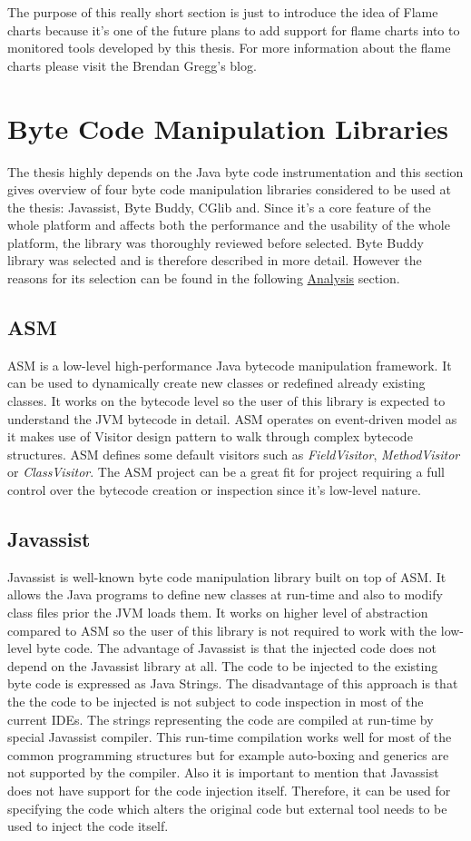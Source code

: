 The purpose of this really short section is just to introduce the idea of Flame charts because it's one of the future plans to add support for flame charts into to monitored tools developed by this thesis. For more information about the flame charts please visit the Brendan Gregg's blog.
\section{Byte Code Manipulation Libraries}
The thesis highly depends on the Java byte code instrumentation and this section gives overview of four byte code manipulation libraries considered to be used at the thesis:  Javassist, Byte Buddy, CGlib and. Since it's a core feature of the whole platform and affects both the performance and the usability of the whole platform, the library was thoroughly reviewed before selected. Byte Buddy library was selected and is therefore described in more detail. However the reasons for its selection can be found in the following \hyperref[analysis]{Analysis} section.

\subsection{ASM}
ASM is a low-level high-performance Java bytecode manipulation framework. It can be used to dynamically create new classes or redefined already existing classes. It works on the bytecode level so the user of this library is expected to understand the JVM bytecode in detail. ASM operates on event-driven model as it makes use of Visitor design pattern to walk through complex bytecode structures. ASM defines some default visitors such as \textit{FieldVisitor}, \textit{MethodVisitor} or \textit{ClassVisitor}. The ASM project can be a great fit for project requiring a full control over the bytecode creation or inspection since it's low-level nature.
\subsection{Javassist}
Javassist is well-known byte code manipulation library built on top of ASM. It allows the Java programs to define new classes at run-time and also to modify class files prior the JVM loads them. It works on higher level of abstraction compared to ASM so the user of this library is not required to work with the low-level byte code. The advantage of Javassist is that the injected code does not depend on the Javassist library at all. The code to be injected to the existing byte code is expressed as Java Strings. The disadvantage of this approach is that the the code to be injected is not subject to code inspection in most of the current IDEs. The strings representing the code are compiled at run-time by special Javassist compiler. This run-time compilation works well for most of the common programming structures but for example auto-boxing and generics are not supported by the compiler. Also it is important to mention that Javassist does not have support for the code injection itself. Therefore, it can be used for specifying the code which alters the original code but external tool needs to be used to inject the code itself.
